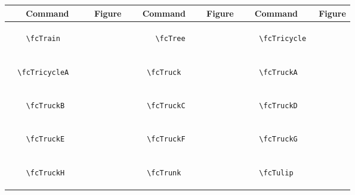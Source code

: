 \documentclass[x11names]{article}
\begin{document}
\begin{table}[H]\centering\begin{tabular}{|c|c|c|c|c|c|}\hline{\bf Command} & {\bf Figure} & {\bf Command} & {\bf Figure} & {\bf Command} & {\bf Figure}\\	\hline	&\multirow{5}{*}{	\fcTrain	[scale=0.8]} & &\multirow{5}{*}{	\fcTree	[scale=0.4]} & &\multirow{5}{*}{	\fcTricycle	[scale=0.4]}\\	& & & & & \\	& & & & & \\	\verb|	\fcTrain	| & & \verb|	\fcTree	| & & \verb|	\fcTricycle	| & \\	& & & & & \\	& & & & & \\	& & & & & \\	\hline									
		&\multirow{5}{*}{	\fcTricycleA	[scale=0.4]} & &\multirow{5}{*}{	\fcTruck	[scale=0.8]} & &\multirow{5}{*}{	\fcTruckA	[scale=0.4]}\\	& & & & & \\	& & & & & \\	\verb|	\fcTricycleA	| & & \verb|	\fcTruck	| & & \verb|	\fcTruckA	| & \\	& & & & & \\	& & & & & \\	& & & & & \\	\hline									
		&\multirow{5}{*}{	\fcTruckB	[scale=0.4]} & &\multirow{5}{*}{	\fcTruckC	[scale=0.4]} & &\multirow{5}{*}{	\fcTruckD	[scale=0.4]}\\	& & & & & \\	& & & & & \\	\verb|	\fcTruckB	| & & \verb|	\fcTruckC	| & & \verb|	\fcTruckD	| & \\	& & & & & \\	& & & & & \\	& & & & & \\	\hline									
		&\multirow{5}{*}{	\fcTruckE	[scale=0.4]} & &\multirow{5}{*}{	\fcTruckF	[scale=0.4]} & &\multirow{5}{*}{	\fcTruckG	[scale=0.4]}\\	& & & & & \\	& & & & & \\	\verb|	\fcTruckE	| & & \verb|	\fcTruckF	| & & \verb|	\fcTruckG	| & \\	& & & & & \\	& & & & & \\	& & & & & \\	\hline									
		&\multirow{5}{*}{	\fcTruckH	[scale=0.4]} & &\multirow{5}{*}{	\fcTrunk	[scale=0.8]} & &\multirow{5}{*}{	\fcTulip	[scale=0.4]}\\	& & & & & \\	& & & & & \\	\verb|	\fcTruckH	| & & \verb|	\fcTrunk	| & & \verb|	\fcTulip	| & \\	& & & & & \\	& & & & & \\	& & & & & \\	\hline									

\end{tabular}
\end{table}
\end{document}
